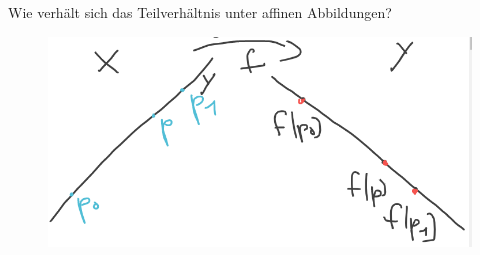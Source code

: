 \begin{frage*}
    Wie verhält sich das Teilverhältnis unter affinen Abbildungen?
    \begin{figure}[H]
        \centering
        \includegraphics[width=0.7\linewidth]{figures/affine_abbildungen_wirkung_auf_teilverhaeltnis}
        \label{fig:affine_abbildungen_wirkung_auf_teilverhaeltnis}
    \end{figure}
    
\end{frage*}